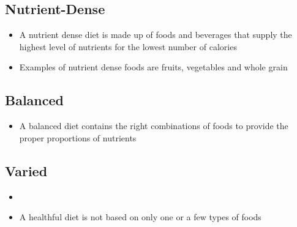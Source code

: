 \documentclass[title={Chapter 2}]{fdsn201notes}
\begin{document}
\subsection{Nutrient-Dense}\label{subsec:a-healthful-diet-is-nutrient-dense}
\begin{itemize}
	\item A nutrient dense diet is made up of foods and beverages that supply the highest level of nutrients for the lowest number of calories
	\item Examples of nutrient dense foods are fruits, vegetables and whole grain
\end{itemize}

\subsection{Balanced}\label{subsec:a-healthful-diet-is-balanced}
\begin{itemize}
	\item A balanced diet contains the right combinations of foods to provide the proper proportions of nutrients
\end{itemize}

\subsection{Varied}\label{subsec:a-healthful-diet-is-varied}
\begin{itemize}
	\item {}
	\item A healthful diet is not based on only one or a few types of foods
\end{itemize}
\end{document}
